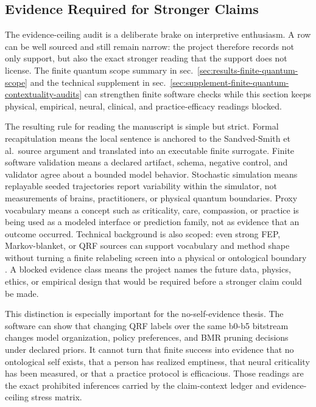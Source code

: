 \documentclass[
]{article}
\begin{document}
\subsection{Evidence Required for Stronger
Claims}\label{sec:discussion-evidence-ceilings}

The evidence-ceiling audit is a deliberate brake on interpretive
enthusiasm. A row can be well sourced and still remain narrow: the
project therefore records not only support, but also the exact stronger
reading that the support does not license. The finite quantum scope
summary in sec.~\ref{sec:results-finite-quantum-scope} and the technical
supplement in
sec.~\ref{sec:supplement-finite-quantum-contextuality-audits} can
strengthen finite software checks while this section keeps physical,
empirical, neural, clinical, and practice-efficacy readings blocked.

The resulting rule for reading the manuscript is simple but strict.
Formal recapitulation means the local sentence is anchored to the
Sandved-Smith et al.~source argument and translated into an executable
finite surrogate. Finite software validation means a declared artifact,
schema, negative control, and validator agree about a bounded model
behavior. Stochastic simulation means replayable seeded trajectories
report variability within the simulator, not measurements of brains,
practitioners, or physical quantum boundaries. Proxy vocabulary means a
concept such as criticality, care, compassion, or practice is being used
as a modeled interface or prediction family, not as evidence that an
outcome occurred. Technical background is also scoped: even strong FEP,
Markov-blanket, or QRF sources can support vocabulary and method shape
without turning a finite relabeling screen into a physical or
ontological boundary
\citep{aguilera2021particular, biehl2021technical_fep, heins2022sparse_coupling}.
A blocked evidence class means the project names the future data,
physics, ethics, or empirical design that would be required before a
stronger claim could be made.

This distinction is especially important for the no-self-evidence
thesis. The software can show that changing QRF labels over the same
b0-b5 bitstream changes model organization, policy preferences, and BMR
pruning decisions under declared priors. It cannot turn that finite
success into evidence that no ontological self exists, that a person has
realized emptiness, that neural criticality has been measured, or that a
practice protocol is efficacious. Those readings are the exact
prohibited inferences carried by the claim-context ledger and
evidence-ceiling stress matrix.
\end{document}
